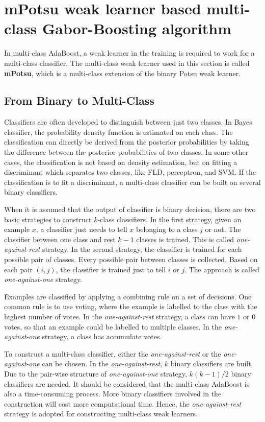 \section{mPotsu weak learner based multi-class Gabor-Boosting algorithm}
\label{sec:mclassGB}
In multi-class AdaBoost, a weak learner in the training is required to work for a multi-class classifier. The multi-class weak learner used in this section is called \textbf{mPotsu}, which is a multi-class extension of the binary Potsu weak learner.  

\subsection{From Binary to Multi-Class}
Classifiers are often developed to distinguish between just two classes. In Bayes classifier, the probability density function is estimated on each class. The classification can directly be derived from the posterior probabilities by taking the difference between the posterior probabilities of two classes. In some other cases, the classification is not based on density estimation, but on fitting a discriminant which separates two classes, like FLD, perceptron, and SVM. If the classification is to fit a discriminant, a multi-class classifier can be built on several binary classifiers.

When it is assumed that the output of classifier is binary decision, there are two basic strategies to construct $k$-class classifiers. In the first strategy, given an example $x$, a classifier just needs to tell $x$ belonging to a class $j$ or not. The classifier between one class and rest $k-1$ classes is trained. This is called \textit{one-against-rest} strategy. In the second strategy, the classifier is trained for each possible pair of classes. Every possible pair between classes is collected. Based on each pair $(i, j)$, the classifier is trained just to tell $i$ or $j$. The approach is called \textit{one-against-one} strategy. 

Examples are classified by applying a combining rule on a set of decisions. One common rule is to use voting, where the example is labelled to the class with the highest number of votes. In the \textit{one-against-rest} strategy, a class can have $1$ or $0$ votes, so that an example could be labelled to multiple classes. In the \textit{one-against-one} strategy, a class has accumulate votes.

To construct a multi-class classifier, either the \textit{one-against-rest} or the \textit{one-against-one} can be chosen. In the \textit{one-against-rest}, $k$ binary classifiers are built. Due to the pair-wise structure of \textit{one-against-one} strategy, $k(k-1)/2$ binary classifiers are needed. It should be considered that the multi-class AdaBoost is also a time-consuming process. More binary classifiers involved in the construction will cost more computational time. Hence, the \textit{one-against-rest} strategy is adopted for constructing multi-class weak learners.

